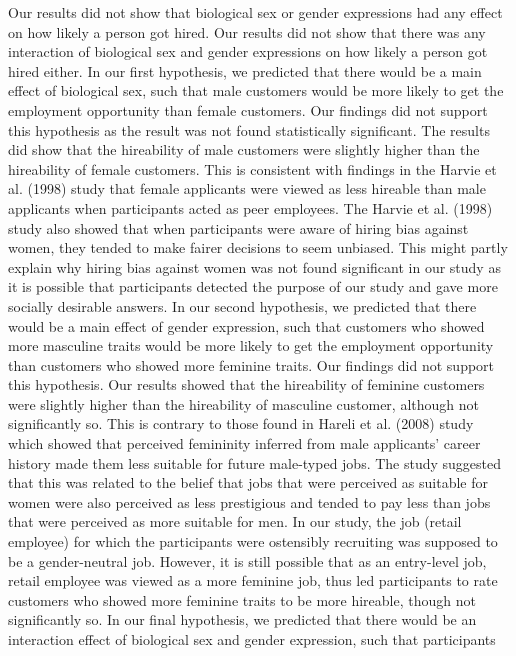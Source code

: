\documentclass[english,man]{apa6}
\theoremstyle{definition}
\theoremstyle{definition}
\theoremstyle{remark}
\begin{document}
Our results did not show that biological sex or gender expressions had
any effect on how likely a person got hired. Our results did not show
that there was any interaction of biological sex and gender expressions
on how likely a person got hired either. In our first hypothesis, we
predicted that there would be a main effect of biological sex, such that
male customers would be more likely to get the employment opportunity
than female customers. Our findings did not support this hypothesis as
the result was not found statistically significant. The results did show
that the hireability of male customers were slightly higher than the
hireability of female customers. This is consistent with findings in the
Harvie et al. (1998) study that female applicants were viewed as less
hireable than male applicants when participants acted as peer employees.
The Harvie et al. (1998) study also showed that when participants were
aware of hiring bias against women, they tended to make fairer decisions
to seem unbiased. This might partly explain why hiring bias against
women was not found significant in our study as it is possible that
participants detected the purpose of our study and gave more socially
desirable answers. In our second hypothesis, we predicted that there
would be a main effect of gender expression, such that customers who
showed more masculine traits would be more likely to get the employment
opportunity than customers who showed more feminine traits. Our findings
did not support this hypothesis. Our results showed that the hireability
of feminine customers were slightly higher than the hireability of
masculine customer, although not significantly so. This is contrary to
those found in Hareli et al. (2008) study which showed that perceived
femininity inferred from male applicants' career history made them less
suitable for future male-typed jobs. The study suggested that this was
related to the belief that jobs that were perceived as suitable for
women were also perceived as less prestigious and tended to pay less
than jobs that were perceived as more suitable for men. In our study,
the job (retail employee) for which the participants were ostensibly
recruiting was supposed to be a gender-neutral job. However, it is still
possible that as an entry-level job, retail employee was viewed as a
more feminine job, thus led participants to rate customers who showed
more feminine traits to be more hireable, though not significantly so.
In our final hypothesis, we predicted that there would be an interaction
effect of biological sex and gender expression, such that participants
\end{document}
